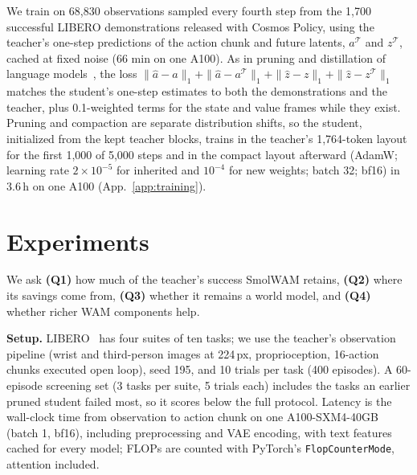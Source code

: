 \documentclass{article}
\newcommand{\smol}{SmolWAM\xspace}
\newcommand{\cosmos}{Cosmos Policy\xspace}
\begin{document}
We train on 68,830 observations sampled every fourth step from the 1,700 successful LIBERO demonstrations released with \cosmos, using the teacher's one-step predictions of the action chunk and future latents, $a^{\mathcal{T}}$ and $z^{\mathcal{T}}$, cached at fixed noise (66 min on one A100).
As in pruning and distillation of language models~\citep{muralidharan2024minitron,hinton2015distilling}, the loss $\|\hat a - a\|_1 + \|\hat a - a^{\mathcal{T}}\|_1 + \|\hat z - z\|_1 + \|\hat z - z^{\mathcal{T}}\|_1$ matches the student's one-step estimates to both the demonstrations and the teacher, plus 0.1-weighted terms for the state and value frames while they exist.
Pruning and compaction are separate distribution shifts, so the student, initialized from the kept teacher blocks, trains in the teacher's 1,764-token layout for the first 1,000 of 5,000 steps and in the compact layout afterward (AdamW; learning rate $2{\times}10^{-5}$ for inherited and $10^{-4}$ for new weights; batch 32; bf16) in 3.6\,h on one A100 (App.~\ref{app:training}).

\section{Experiments}
\label{sec:experiments}

We ask \textbf{(Q1)} how much of the teacher's success \smol retains, \textbf{(Q2)} where its savings come from, \textbf{(Q3)} whether it remains a world model, and \textbf{(Q4)} whether richer WAM components help.

\textbf{Setup.}
LIBERO~\citep{liu2023libero} has four suites of ten tasks; we use the teacher's observation pipeline (wrist and third-person images at 224\,px, proprioception, 16-action chunks executed open loop), seed 195, and 10 trials per task (400 episodes).
A 60-episode screening set (3 tasks per suite, 5 trials each) includes the tasks an earlier pruned student failed most, so it scores below the full protocol.
Latency is the wall-clock time from observation to action chunk on one A100-SXM4-40GB (batch 1, bf16), including preprocessing and VAE encoding, with text features cached for every model; FLOPs are counted with PyTorch's \texttt{FlopCounterMode}, attention included.
\end{document}
